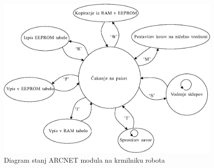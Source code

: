 \begin{figure}
	\centering
	\includegraphics[scale=0.5]{./Slike/pa10-state.eps}
	\caption{Diagram stanj ARCNET modula na krmilniku robota}
	\label{fig:pa10-state}
\end{figure}
